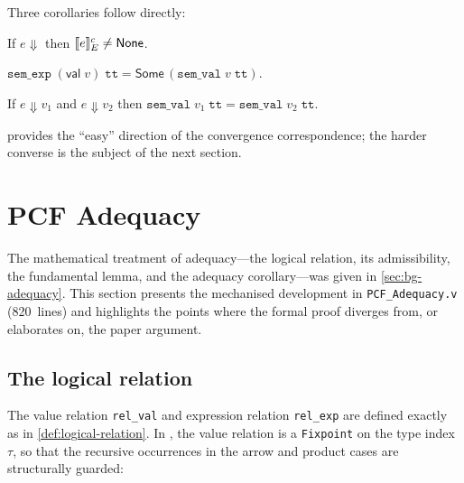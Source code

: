 \medskip

\noindent
Three corollaries follow directly:

\begin{corollary}
\label{cor:sound-not-none}
If\/ $e \Downarrow$ then $\llbracket e \rrbracket^c_E \neq \mathsf{None}$.
\end{corollary}

\begin{corollary}
\label{cor:sound-val}
$\texttt{sem\_exp}\;(\mathsf{val}\;v)\;\mathtt{tt}
  = \mathsf{Some}\,(\texttt{sem\_val}\;v\;\mathtt{tt})$.
\end{corollary}

\begin{corollary}
\label{cor:sound-agree}
If\/ $e \Downarrow v_1$ and $e \Downarrow v_2$ then
$\texttt{sem\_val}\;v_1\;\mathtt{tt}
  = \texttt{sem\_val}\;v_2\;\mathtt{tt}$.
\end{corollary}

\noindent
{} provides the ``easy'' direction of the
convergence correspondence; the harder converse is the subject of
the next section.

\section{PCF Adequacy}
\label{sec:res-adequacy}


The mathematical treatment of adequacy---the logical relation, its
admissibility, the fundamental lemma, and the adequacy
corollary---was given in \cref{sec:bg-adequacy}.  This section presents
the mechanised development in \texttt{PCF\_Adequacy.v} (820~lines) and
highlights the points where the formal proof diverges from, or
elaborates on, the paper argument.

\subsection*{The logical relation}

The value relation \texttt{rel\_val} and expression relation
\texttt{rel\_exp} are defined exactly as in
\cref{def:logical-relation}.  In \Rocq{}, the value relation is a
\texttt{Fixpoint} on the type index~$\tau$, so that the recursive
occurrences in the arrow and product cases are structurally guarded:

